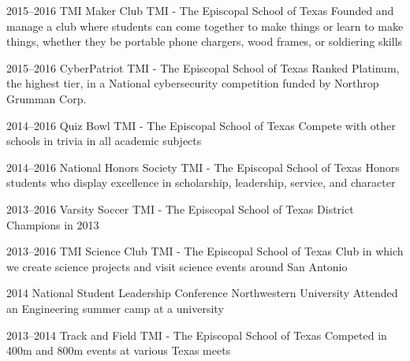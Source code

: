 \documentclass[]{friggeri-cv} %
\begin{document}
\begin{entrylist}


	\entry
	{2015--2016}
	{TMI Maker Club}
	{TMI - The Episcopal School of Texas}
	{Founded and manage a club where students can come together to make things or learn to make things, whether they be portable phone chargers, wood frames, or soldiering skills}


	\entry
	{2015--2016}
	{CyberPatriot}
	{TMI - The Episcopal School of Texas}
	{Ranked Platinum, the highest tier, in a National cybersecurity competition funded by Northrop Grumman Corp.}


	\entry
	{2014--2016}
	{Quiz Bowl}
	{TMI - The Episcopal School of Texas}
	{Compete with other schools in trivia in all academic subjects}


	\entry
	{2014--2016}
	{National Honors Society}
	{TMI - The Episcopal School of Texas}
	{Honors students who display excellence in scholarship, leadership, service, and character}


	\entry
	{2013--2016}
	{Varsity Soccer}
	{TMI - The Episcopal School of Texas}
	{District Champions in 2013}


	\entry
	{2013--2016}
	{TMI Science Club}
	{TMI - The Episcopal School of Texas}
	{Club in which we create science projects and visit science events around San Antonio}


	\entry
	{2014}
	{National Student Leadership Conference}
	{Northwestern University}
	{Attended an Engineering summer camp at a university}


	\entry
	{2013--2014}
	{Track and Field}
	{TMI - The Episcopal School of Texas}
	{Competed in 400m and 800m events at various Texas meets}


\end{entrylist}
\end{document}
